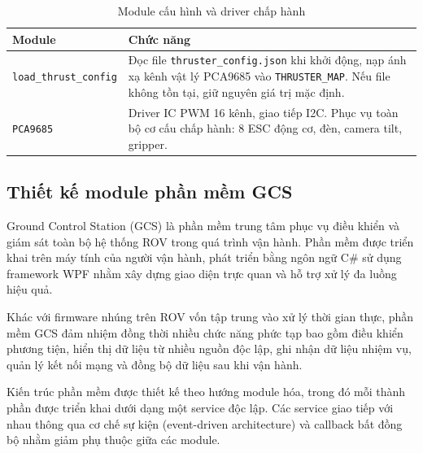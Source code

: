 \documentclass[../DoAn.tex]{subfiles}
\begin{document}
\begin{table}[H]

\centering

\renewcommand{\arraystretch}{1.3}

\begin{tabular}{|l|p{9cm}|}

\hline

\textbf{Module} & \textbf{Chức năng} \\

\hline

\texttt{load\_thrust\_config} &
Đọc file \texttt{thruster\_config.json} khi khởi động, nạp ánh xạ kênh vật lý PCA9685 vào \texttt{THRUSTER\_MAP}. Nếu file không tồn tại, giữ nguyên giá trị mặc định. \\

\hline

\texttt{PCA9685} & 
Driver IC PWM 16 kênh, giao tiếp I2C. Phục vụ toàn bộ cơ cấu
chấp hành: 8 ESC động cơ, đèn, camera tilt, gripper. \\

\hline

\end{tabular}

\caption{Module cấu hình và driver chấp hành}

\label{tab:config_modules}

\end{table}

\subsection{Thiết kế module phần mềm GCS}


Ground Control Station (GCS) là phần mềm trung tâm phục vụ điều khiển và
giám sát toàn bộ hệ thống ROV trong quá trình vận hành. Phần mềm được
triển khai trên máy tính của người vận hành, phát triển bằng ngôn ngữ
C# sử dụng framework WPF nhằm xây dựng giao diện trực quan và hỗ trợ xử
lý đa luồng hiệu quả.

Khác với firmware nhúng trên ROV vốn tập trung vào xử lý thời gian thực,
phần mềm GCS đảm nhiệm đồng thời nhiều chức năng phức tạp bao gồm điều
khiển phương tiện, hiển thị dữ liệu từ nhiều nguồn độc lập, ghi nhận dữ
liệu nhiệm vụ, quản lý kết nối mạng và đồng bộ dữ liệu sau khi vận hành.

Kiến trúc phần mềm được thiết kế theo hướng module hóa, trong đó mỗi
thành phần được triển khai dưới dạng một service độc lập. Các service
giao tiếp với nhau thông qua cơ chế sự kiện (event-driven architecture)
và callback bất đồng bộ nhằm giảm phụ thuộc giữa các module.
\end{document}
